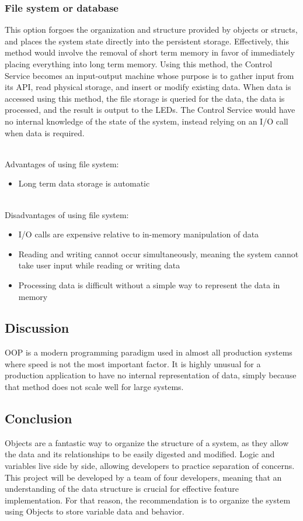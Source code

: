 			\subsubsection{File system or database}
			This option forgoes the organization and structure provided by objects or structs, and places the system state directly into the persistent storage.
			Effectively, this method would involve the removal of short term memory in favor of immediately placing everything into long term memory.
			Using this method, the Control Service becomes an input-output machine whose purpose is to gather input from its API, read physical storage, and insert or modify existing data.
			When data is accessed using this method, the file storage is queried for the data, the data is processed, and the result is output to the LEDs.
			The Control Service would have no internal knowledge of the state of the system, instead relying on an I/O call when data is required.

			\noindent \\Advantages of using file system:
			\begin{itemize}
				\item Long term data storage is automatic
			\end{itemize}

			\noindent \\Disadvantages of using file system:
			\begin{itemize}
				\item I/O calls are expensive relative to in-memory manipulation of data
				\item Reading and writing cannot occur simultaneously, meaning the system cannot take user input while reading or writing data
				\item Processing data is difficult without a simple way to represent the data in memory
			\end{itemize}


			\subsection{Discussion}
			OOP is a modern programming paradigm used in almost all production systems where speed is not the most important factor.
			It is highly unusual for a production application to have no internal representation of data, simply because that method does not scale well for large systems.

			\subsection{Conclusion}
			Objects are a fantastic way to organize the structure of a system, as they allow the data and its relationships to be easily digested and modified.
			Logic and variables live side by side, allowing developers to practice separation of concerns.
			This project will be developed by a team of four developers, meaning that an understanding of the data structure is crucial for effective feature implementation.
			For that reason, the recommendation is to organize the system using Objects to store variable data and behavior.
